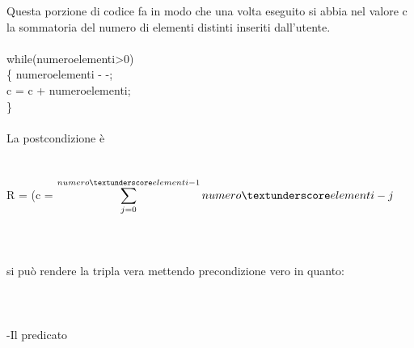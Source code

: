 \documentclass[11pt, a4paper, titlepage, block]{article}
\begin{document}
Questa porzione di codice fa in modo che una volta eseguito si abbia nel valore c la sommatoria del numero di elementi distinti inseriti dall'utente.	
\\
\\	
while(numero\textunderscore elementi\textgreater 0)\\
\{
numero\textunderscore elementi - -;\\
c = c + numero\textunderscore elementi;\\
\}
\\
\\
La postcondizione \`e 
\\
\\
\\
R = (c = $\displaystyle \sum_{j=0}^{numero\textunderscore elementi-1} numero\textunderscore elementi - j $\\
\\
\\
\\
si può rendere la tripla vera mettendo precondizione vero  in quanto:\\
\\
\\
\\
 -Il predicato
 
\end{document}
